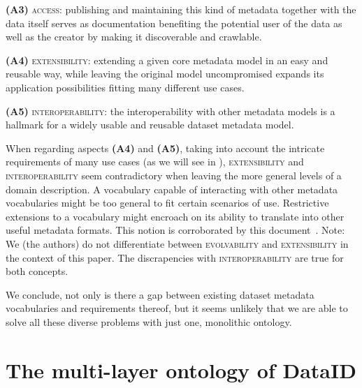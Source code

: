 \documentclass[runningheads,a4paper]{llncs}
\newcommand{\access}{{\scshape access}\xspace}
\newcommand{\extensibility}{{\scshape extensibility}\xspace}
\newcommand{\interoperability}{{\scshape interoperability}\xspace}
\newcommand{\evolvability}{{\scshape evolvability}\xspace}
\begin{document}
\textbf{(A3)} \access: publishing and maintaining
this kind of metadata together with the data itself serves as
documentation benefiting the potential user
of the data as well as the creator by making it discoverable
and crawlable.

\textbf{(A4)} \extensibility: extending a given core metadata model
in an easy and reusable way, while leaving the original model
uncompromised expands its application possibilities fitting many
different use cases.

\textbf{(A5)} \interoperability: the interoperability with other metadata models is a hallmark for a widely usable and reusable dataset metadata model.

When regarding aspects \textbf{(A4)} and \textbf{(A5)}, taking into account the intricate requirements of many use cases (as we will see in ), \extensibility and \interoperability seem contradictory when leaving the more general levels of a domain description. A vocabulary capable of interacting with other metadata vocabularies might be too general to fit certain scenarios of use. Restrictive extensions to a vocabulary might encroach on its ability to translate into other useful metadata formats. This notion is corroborated by this document~\cite{ivse}. Note: We (the authors) do not differentiate between \evolvability and \extensibility in the context of this paper. The discrapencies with \interoperability are true for both concepts. 

We conclude, not only is there a gap between existing dataset metadata vocabularies and requirements thereof, but it seems unlikely that we are able to solve all these diverse problems with just one, monolithic ontology.



\section{The multi-layer ontology of DataID} %
\label{dataid}
\end{document}
